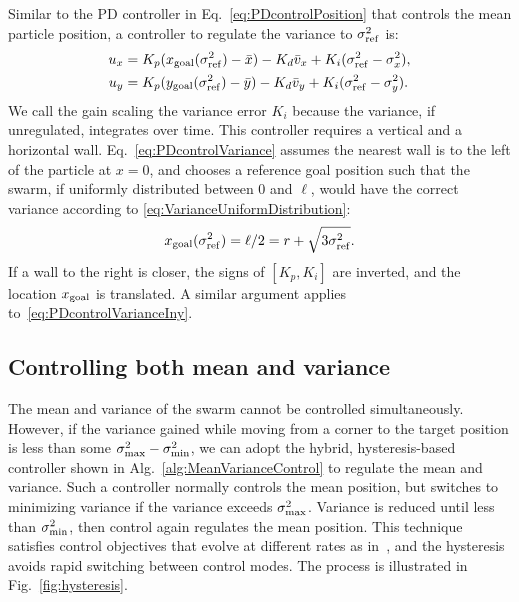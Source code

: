 Similar to the PD controller in Eq.~\eqref{eq:PDcontrolPosition} that controls the mean particle position, a controller to regulate the variance to $\sigma^2_{\rm{ref}}$ is:
\begin{align}
u_x &= K_{p}(x_{\rm{goal}}(\sigma^2_{\rm{ref}}) - \bar{x}) - K_{d}\bar{v}_x + K_{i}(\sigma^2_{\rm{ref}}-\sigma^2_{x}),   \label{eq:PDcontrolVariance}\\
u_y &= K_{p}(y_{\rm{goal}}(\sigma^2_{\rm{ref}})  - \bar{y}) - K_{d}\bar{v}_y + K_{i}(\sigma^2_{\rm{ref}}-\sigma^2_{y}).  \label{eq:PDcontrolVarianceIny}
\end{align}
We call the gain scaling the variance error $K_i$ because the variance, if unregulated, integrates over time. This controller requires a vertical and a horizontal wall.
Eq.~\eqref{eq:PDcontrolVariance} assumes the nearest wall is to the left of the particle at $x=0$, and chooses a reference goal position such that the swarm, if uniformly distributed between 0 and $\ell$, would have the correct variance according to \eqref{eq:VarianceUniformDistribution}:
\begin{align}
x_{\rm{goal}}(\sigma^2_{\rm{ref}}) = \ell/2 = r + \sqrt{3\sigma^2_{\rm{ref}}}.
\end{align}
 If a wall to the right is closer, the signs of $[K_p,K_i]$ are inverted, and the location $x_{\rm{goal}}$ is translated.  A similar argument applies to~\eqref{eq:PDcontrolVarianceIny}.


\subsection{Controlling both mean and variance}

The mean and variance of the swarm cannot be controlled simultaneously.
However, if the variance gained while moving from a corner to the target position is less than some $\sigma_{\rm{max}}^2-\sigma_{\rm{min}}^2$, we can adopt the hybrid, hysteresis-based controller shown in Alg.~\ref{alg:MeanVarianceControl} to regulate the mean and variance.  
 Such a controller normally controls the mean position, but switches to minimizing variance if the variance exceeds $\sigma_{\rm{max}}^2$. 
 Variance is reduced until less than $\sigma_{\rm{min}}^2$, then control again regulates the mean position. 
 This technique satisfies control objectives that evolve at different rates as in~\cite{kloetzer2007temporal}, and the hysteresis avoids rapid switching between control modes. The process is illustrated in Fig.~\ref{fig:hysteresis}. 


